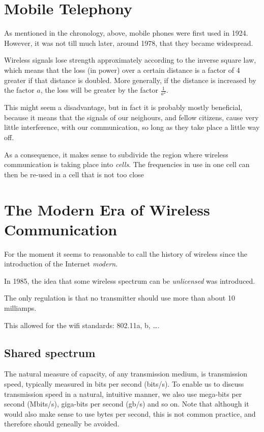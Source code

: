 \section{Mobile Telephony}

As mentioned in the chronology, above, mobile phones were first used in 1924. However,
it was not till much later, around 1978, that they became widespread. 

Wireless signals lose strength approximately according to the inverse square law,
which means that the loss (in power) over a certain distance is a factor of 4 greater
if that distance is doubled. More generally, if the distance is increased by the factor
$a$, the loss will be greater by the factor $\frac{1}{ a^2}$. 

This might seem a disadvantage, but in fact it is probably mostly beneficial, because it 
means that the signals of our neighours, and fellow citizens, cause very little interference,
with our communication, so long as they take place a little way off.

As a consequence, it makes sense to subdivide the region where wireless communication is taking
place into {\em cells}. The frequencies in use in one cell can then be re-used in a cell that
is not too close

\section{The Modern Era of Wireless Communication}

For the moment it seems to reasonable to call the history of wireless since the introduction 
of the Internet {\em modern}.

In 1985, the idea that some wireless spectrum can be {\em unlicensed} was introduced.

The only regulation is that no transmitter should use more than about 10 milliamps.

This allowed for the wifi standards: 802.11a, b, \dots.

\subsection{Shared spectrum}

The natural measure of capacity, of any transmission medium, is transmission speed, typically
measured in bits per second (bits/s). To enable us to discuss transmission speed in a 
natural, intuitive manner, we also use mega-bits per second (Mbits/s), giga-bits per second (gb/s)
and so on. Note that although it would also make sense to use bytes per second, this is not
common practice, and therefore should geneally be avoided.


